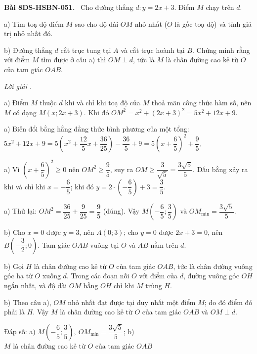 \documentclass[12pt,a4paper]{article}
\newenvironment{problem}[1][]{\par\medskip\noindent\textbf{Bài #1.}\ }{\par}
\newenvironment{solution}[1][]{\par\noindent\textit{Lời giải #1.}\par}{\par}
\begin{document}
\begin{problem}[8DS-HSBN-051]
Cho đường thẳng $d\colon y = 2x + 3$. Điểm $M$ chạy trên $d$.

a) Tìm toạ độ điểm $M$ sao cho độ dài $OM$ nhỏ nhất ($O$ là gốc toạ độ) và tính giá trị nhỏ nhất đó.

b) Đường thẳng $d$ cắt trục tung tại $A$ và cắt trục hoành tại $B$. Chứng minh rằng với điểm $M$ tìm được ở câu a) thì $OM \perp d$, tức là $M$ là chân đường cao kẻ từ $O$ của tam giác $OAB$.

\begin{solution}
a) Điểm $M$ thuộc $d$ khi và chỉ khi toạ độ của $M$ thoả mãn công thức hàm số, nên $M$ có dạng $M(x; 2x + 3)$. Khi đó $OM^2 = x^2 + (2x + 3)^2 = 5x^2 + 12x + 9$.

a) Biến đổi bằng hằng đẳng thức bình phương của một tổng: $5x^2 + 12x + 9 = 5\left(x^2 + \dfrac{12}{5}x + \dfrac{36}{25}\right) - \dfrac{36}{5} + 9 = 5\left(x + \dfrac{6}{5}\right)^2 + \dfrac{9}{5}$.

a) Vì $\left(x + \dfrac{6}{5}\right)^2 \geq 0$ nên $OM^2 \geq \dfrac{9}{5}$, suy ra $OM \geq \dfrac{3}{\sqrt{5}} = \dfrac{3\sqrt{5}}{5}$. Dấu bằng xảy ra khi và chỉ khi $x = -\dfrac{6}{5}$; khi đó $y = 2 \cdot \left(-\dfrac{6}{5}\right) + 3 = \dfrac{3}{5}$.

a) Thử lại: $OM^2 = \dfrac{36}{25} + \dfrac{9}{25} = \dfrac{9}{5}$ (đúng). Vậy $M\left(-\dfrac{6}{5}; \dfrac{3}{5}\right)$ và $OM_{\min} = \dfrac{3\sqrt{5}}{5}$.

b) Cho $x = 0$ được $y = 3$, nên $A(0; 3)$; cho $y = 0$ được $2x + 3 = 0$, nên $B\left(-\dfrac{3}{2}; 0\right)$. Tam giác $OAB$ vuông tại $O$ và $AB$ nằm trên $d$.

b) Gọi $H$ là chân đường cao kẻ từ $O$ của tam giác $OAB$, tức là chân đường vuông góc hạ từ $O$ xuống $d$. Trong các đoạn nối $O$ với điểm của $d$, đường vuông góc $OH$ ngắn nhất, và độ dài $OM$ bằng $OH$ chỉ khi $M$ trùng $H$.

b) Theo câu a), $OM$ nhỏ nhất đạt được tại duy nhất một điểm $M$; do đó điểm đó phải là $H$. Vậy $M$ là chân đường cao kẻ từ $O$ của tam giác $OAB$ và $OM \perp d$.

Đáp số: a) $\boxed{M\left(-\dfrac{6}{5}; \dfrac{3}{5}\right),\ OM_{\min} = \dfrac{3\sqrt{5}}{5}}$; b) $\boxed{M \text{ là chân đường cao kẻ từ } O \text{ của tam giác } OAB}$
\end{solution}
\end{problem}
\end{document}
